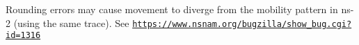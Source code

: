 
\begin{DoxyRefList}
\item[\label{bug__bug000001}%
\hypertarget{bug__bug000001}{}%
Class \hyperlink{classns3_1_1Ns2MobilityHelper}{ns3\+:\+:Ns2\+Mobility\+Helper} ]Rounding errors may cause movement to diverge from the mobility pattern in ns-\/2 (using the same trace). See \href{https://www.nsnam.org/bugzilla/show_bug.cgi?id=1316}{\tt https\+://www.\+nsnam.\+org/bugzilla/show\+\_\+bug.\+cgi?id=1316} 
\end{DoxyRefList}
